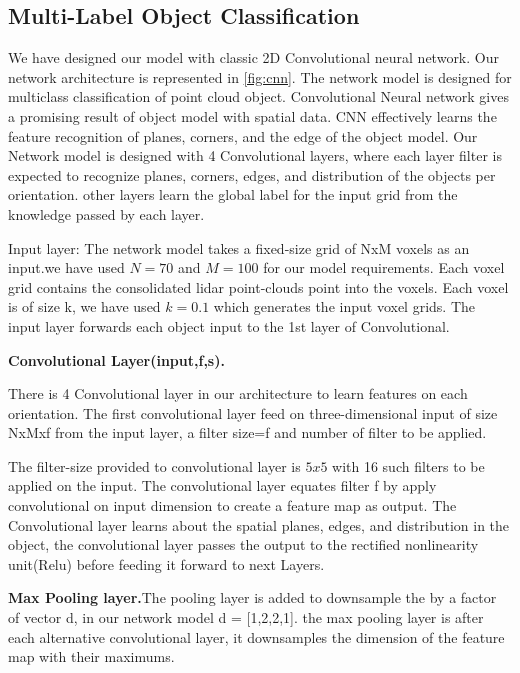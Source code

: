 
\subsection{Multi-Label Object Classification}

We have designed our model with classic 2D Convolutional neural network.
Our network architecture is represented in \ref{fig:cnn}.
The network model is designed for multiclass classification of point cloud object. Convolutional Neural network gives a promising result of object model with spatial data. CNN effectively learns the feature recognition of planes, corners, and the edge of the object model. Our Network model is designed with 4 Convolutional layers, where each layer filter is expected to recognize
planes, corners, edges, and distribution of the objects per orientation.
other layers learn the global label for the input grid from the knowledge passed by each layer.

Input layer:
The network model takes a fixed-size grid of NxM voxels as an input.we have used $N=70$ and $M=100$ for our model requirements.
Each voxel grid contains the consolidated lidar point-clouds point into the voxels. Each voxel is of size k, we have used $k=0.1$
which generates the input voxel grids. The input layer forwards each object input to the 1st layer of Convolutional.


\textbf{Convolutional Layer(input,f,s).}

There is 4 Convolutional layer in our architecture to learn features on each orientation.
The first convolutional layer feed on three-dimensional input of size NxMxf from the input layer, a filter size=f and number of filter to be applied.

The filter-size provided to convolutional layer is $5x5$ with 16 such filters to be applied on the input.
The convolutional layer equates filter f by apply convolutional on input dimension to create a feature map as output.
The Convolutional layer learns about the spatial planes, edges, and distribution in the object, the convolutional layer passes the output to the rectified nonlinearity unit(Relu) before feeding it forward to next Layers.

\textbf{Max Pooling layer.}The pooling layer is added to downsample the by a factor of vector d, in our network model d = [1,2,2,1].
the max pooling layer is after each alternative convolutional layer, it downsamples the dimension of the feature map with their maximums.

